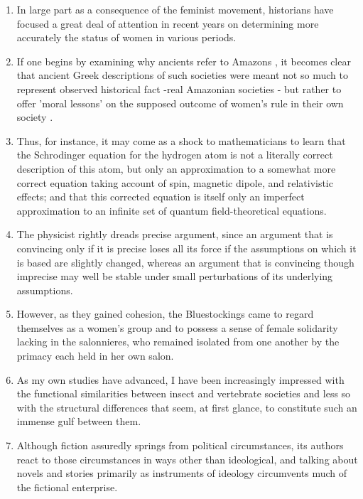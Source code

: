 \begin{enumerate}
\item In large part as a consequence of the feminist movement, historians have focused a great deal of attention in recent years on determining more accurately the status of women in various periods.

\item If one begins by examining why ancients refer to Amazons , it becomes clear that ancient Greek descriptions of such societies were meant not so much to represent observed historical fact -real Amazonian societies - but rather to offer 'moral lessons' on the supposed outcome of women's rule in their own society .

\item Thus, for instance, it may come as a shock to mathematicians to learn that the Schrodinger equation for the hydrogen atom is not a literally correct description of this atom, but only an approximation to a somewhat more correct equation taking account of spin, magnetic dipole, and relativistic effects; and that this corrected equation is itself only an imperfect approximation to an infinite set of quantum field-theoretical equations. 

\item The physicist rightly dreads precise argument, since an argument that is convincing only if it is precise loses all its force if the assumptions on which it is based are slightly changed, whereas an argument that is convincing though imprecise may well be stable under small perturbations of its underlying assumptions.

\item However, as they gained cohesion, the Bluestockings came to regard themselves as a women's group and to possess a sense of female solidarity lacking in the salonnieres, who remained isolated from one another by the primacy each held in her own salon. 

\item As my own studies have advanced, I have been increasingly impressed with the functional similarities between insect and vertebrate societies and less so with the structural differences that seem, at first glance, to constitute such an immense gulf between them. 

\item Although fiction assuredly springs from political circumstances, its authors react to those circumstances in ways other than ideological, and talking about novels and stories primarily as instruments of ideology circumvents much of the fictional enterprise.


\end{enumerate}
